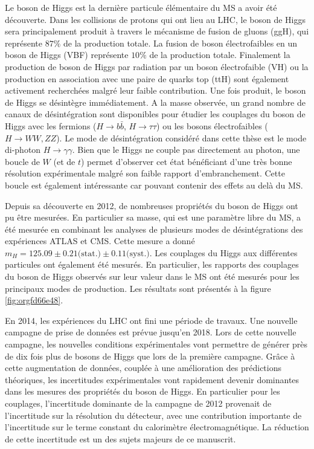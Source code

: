 Le boson de Higgs est la dernière particule élémentaire du MS a avoir été découverte.
Dans les collisions de protons qui ont lieu au LHC, le boson de Higgs sera principalement produit à travers le mécanisme de fusion de gluons (ggH), qui représente $87\%$ de la production totale.
La fusion de boson électrofaibles en un boson de Higgs (VBF) représente $10\%$ de la production totale.
Finalement la production de boson de Higgs par radiation par un boson électrofaible (VH) ou la production en association avec une paire de quarks top (ttH) sont également activement recherchées malgré leur faible contribution.
Une fois produit, le boson de Higgs se désintègre immédiatement.
A la masse observée, un grand nombre de canaux de désintégration sont disponibles pour étudier les couplages du boson de Higgs avec les fermions ($H\rightarrow b\bar{b}$, $H\rightarrow \tau\tau$) ou les bosons électrofaibles ($H\rightarrow WW, ZZ$).
Le mode de désintégration considéré dans cette thèse est le mode di-photon $H\rightarrow \gamma\gamma$.
Bien que le Higgs ne couple pas directement au photon, une boucle de $W$ (et de $t$) permet d'observer cet état bénéficiant d'une très bonne résolution expérimentale malgré son faible rapport d'embranchement.
Cette boucle est également intéressante car pouvant contenir des effets au delà du MS.

Depuis sa découverte en 2012, de nombreuses propriétés du boson de Higgs ont pu être mesurées.
En particulier sa masse, qui est une paramètre libre du MS, a été mesurée en combinant les analyses de plusieurs modes de désintégrations des expériences ATLAS et CMS.
Cette mesure a donné $m_H = 125.09 \pm 0.21 \text{(stat.)} \pm 0.11 \text{(syst.)}$.
Les couplages du Higgs aux différentes particules ont également été mesurés.
En particulier, les rapports des couplages du boson de Higgs observés sur leur valeur dans le MS  ont été mesurés pour les principaux modes de production.
Les résultats sont présentés à la figure \ref{fig:orgfd66e48}.

En 2014, les expériences du LHC ont fini une période de travaux.
Une nouvelle campagne de prise de données est prévue jusqu'en 2018.
Lors de cette nouvelle campagne, les nouvelles conditions expérimentales vont permettre de générer près de dix fois plus de bosons de Higgs que lors de la première campagne.
Grâce à cette augmentation de données, couplée à une amélioration des prédictions théoriques, les incertitudes expérimentales vont rapidement devenir dominantes dans les mesures des propriétés du boson de Higgs.
En particulier pour les couplages, l'incertitude dominante de la campagne de 2012 provenait de l'incertitude sur la résolution du détecteur, avec une contribution importante de l'incertitude sur le terme constant du calorimètre électromagnétique.
La réduction de cette incertitude est un des sujets majeurs de ce manuscrit.

